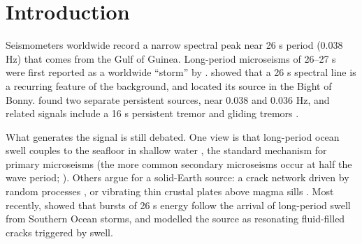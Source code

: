 \documentclass[11pt]{article}
\begin{document}
\begin{abstract}
\noindent A narrow 26 s seismic signal from the Gulf of Guinea has been known since the 1960s, but its source is unexplained. Using 7.4 years of data from station G.EDA (Cameroon) and six more distant stations, we show that the signal is modulated by the ocean tide. At EDA, its power varies with the principal lunar tide (M2) with an amplitude of 0.47 dB (95\% confidence interval 0.42--0.53 dB; about $\pm$11\% in power), peaking 1.6 h after high water. The modulation passes conservative null tests ($p \le 0.001$). The same lag is found at TAM (Algeria) and SACV (Cape Verde), and consistently at two weaker stations (combined 1.8 h; 1.5--2.1 h), so it arises at the source. The amplitude grows with tidal range, consistent with proportional scaling. Linear effects of tidal water depth at shelf depths are 4--40 times too weak, pointing to very shallow coupling or a nonlinear source.
\end{abstract}

\section{Introduction}
Seismometers worldwide record a narrow spectral peak near 26 s period (0.038 Hz) that comes from the Gulf of Guinea. Long-period microseisms of 26--27 s were first reported as a worldwide ``storm'' by \citet{oliver1962}. \citet{holcomb1980,holcomb1998} showed that a 26 s spectral line is a recurring feature of the background, and \citet{shapiro2006} located its source in the Bight of Bonny. \citet{xia2013} found two separate persistent sources, near 0.038 and 0.036 Hz, and related signals include a 16 s persistent tremor \citep{xia2020,takano2025} and gliding tremors \citep{bruland2023}.

What generates the signal is still debated. One view is that long-period ocean swell couples to the seafloor in shallow water \citep{bernard1990}, the standard mechanism for primary microseisms \citep{hasselmann1963,ardhuin2018} (the more common secondary microseisms occur at half the wave period; \citealp{longuethiggins1950}). Others argue for a solid-Earth source: a crack network driven by random processes \citep{chen2022}, or vibrating thin crustal plates above magma sills \citep{xia2024}. Most recently, \citet{poli2026} showed that bursts of 26 s energy follow the arrival of long-period swell from Southern Ocean storms, and modelled the source as resonating fluid-filled cracks triggered by swell.
\end{document}
